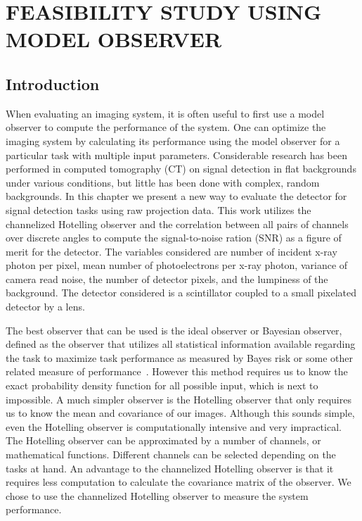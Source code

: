 \chapter{FEASIBILITY STUDY USING MODEL OBSERVER}
\label{chap:model_observer}

\section{Introduction}
When evaluating an imaging system, it is often useful to first use a model observer to compute the performance of the system.  One can optimize the imaging system by calculating its performance using the model observer for a particular task with multiple input parameters.  Considerable research has been performed in computed tomography (CT) on signal detection in flat backgrounds under various conditions, but little has been done with complex, random backgrounds.  In this chapter we present a new way to evaluate the detector for signal detection tasks using raw projection data.  This work utilizes the channelized Hotelling observer and the correlation between all pairs of channels over discrete angles to compute the signal-to-noise ration (SNR) as a figure of merit for the detector.  The variables considered are number of incident x-ray photon per pixel, mean number of photoelectrons per x-ray photon, variance of camera read noise, the number of detector pixels, and the lumpiness of the background.  The detector considered is a scintillator coupled to a small pixelated detector by a lens.

The best observer that can be used is the ideal observer or Bayesian observer, defined as the observer that utilizes all statistical information available regarding the task to maximize task performance as measured by Bayes risk or some other related measure of performance~\citep{Barrett2004, Barrett2013}.  However this method requires us to know the exact probability density function for all possible input, which is next to impossible.  A much simpler observer is the Hotelling observer that only requires us to know the mean and covariance of our images.  Although this sounds simple, even the Hotelling observer is computationally intensive and very impractical.  The Hotelling observer can be approximated by a number of channels, or mathematical functions.  Different channels can be selected depending on the tasks at hand.  An advantage to the channelized Hotelling observer is that it requires less computation to calculate the covariance matrix of the observer.  We chose to use the channelized Hotelling observer to measure the system performance.

